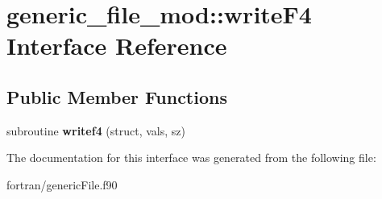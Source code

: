 \hypertarget{interfacegeneric__file__mod_1_1write_f4}{}\section{generic\+\_\+file\+\_\+mod\+:\+:write\+F4 Interface Reference}
\label{interfacegeneric__file__mod_1_1write_f4}
\subsection*{Public Member Functions}
\begin{DoxyCompactItemize}
\item 
\mbox{\label{interfacegeneric__file__mod_1_1write_f4_a4dbfc252638fce84260882e2136dd26a}} 
subroutine {\bfseries writef4} (struct, vals, sz)
\end{DoxyCompactItemize}


The documentation for this interface was generated from the following file\+:\begin{DoxyCompactItemize}
\item 
fortran/generic\+File.\+f90\end{DoxyCompactItemize}
